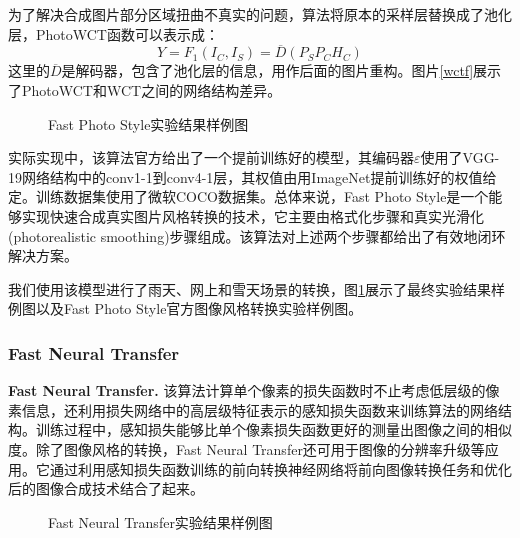 为了解决合成图片部分区域扭曲不真实的问题，算法将原本的采样层替换成了池化层，PhotoWCT函数可以表示成：
$$Y=F_1(I_C,I_S)=\overline{D}(P_SP_CH_C)$$
这里的$\overline{D}$是解码器，包含了池化层的信息，用作后面的图片重构。图片\ref{wctf}展示了PhotoWCT和WCT之间的网络结构差异。

\begin{figure}[t]
    \centering
    \caption{Fast Photo Style实验结果样例图}
    \label{fps-result}
\end{figure}

实际实现中，该算法官方给出了一个提前训练好的模型，其编码器$\varepsilon$使用了VGG-19网络结构中的conv1-1到conv4-1层，其权值由用ImageNet提前训练好的权值给定。训练数据集使用了微软COCO数据集\cite{coco}。总体来说，Fast Photo Style是一个能够实现快速合成真实图片风格转换的技术，它主要由格式化步骤和真实光滑化(photorealistic smoothing)步骤组成。该算法对上述两个步骤都给出了有效地闭环解决方案。

我们使用该模型进行了雨天、网上和雪天场景的转换，图\ref{fps-result}展示了最终实验结果样例图以及Fast Photo Style官方图像风格转换实验样例图。


\subsubsection{Fast Neural Transfer}

\textbf{Fast Neural Transfer.}\cite{FNT} 该算法计算单个像素的损失函数时不止考虑低层级的像素信息，还利用损失网络中的高层级特征表示的感知损失函数来训练算法的网络结构。训练过程中，感知损失能够比单个像素损失函数更好的测量出图像之间的相似度。除了图像风格的转换，Fast Neural Transfer还可用于图像的分辨率升级等应用。它通过利用感知损失函数训练的前向转换神经网络将前向图像转换任务和优化后的图像合成技术结合了起来。

\begin{figure}[!bh]
    \centering
    \caption{Fast Neural Transfer实验结果样例图}
    \label{fnt-result}
\end{figure}

